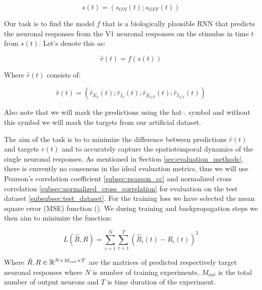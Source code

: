 \begin{equation*}
    s(t)=\left(s_{ON}(t); s_{OFF}(t)\right)
\end{equation*}

Our task is to find the model $f$ that is a biologically plausible RNN that predicts the neuronal responses from the V1 neuronal responses on the stimulus in time $t$ from $s(t)$. Let's denote this as:

\begin{equation*}
    \hat{r}(t) = f(s(t))
\end{equation*}

Where $\hat{r}(t)$ consists of:

\begin{equation*}
    \hat{r}(t) = \left(\hat{r}_{E_4}(t); \hat{r}_{I_4}(t); \hat{r}_{E_{2/3}}(t); \hat{r}_{I_{2/3}}(t)\right)
\end{equation*}

Also note that we will mark the predictions using the hat $\hat{.}$ symbol and without this symbol we will mark the targets from our artificial dataset.

The aim of the task is to to minimize the difference between predictions $\hat{r}(t)$ and targets $r(t)$ and to accurately capture the spatiotemporal dynamics of the single neuronal responses. As mentioned in Section \ref{sec:evaluation_methods}, there is currently no consensus in the ideal evaluation metrics, thus we will use Pearson's correlation coefficient \ref{subsec:pearson_cc} and normalized cross correlation \ref{subsec:normalized_cross_correlation} for evaluation on the test dataset \ref{subsubsec:test_dataset}. For the training loss we have selected the mean square error (MSE) function (\citet{alpaydin2020introduction}). We during training and backpropagation steps we then aim to minimize the function:

$$L(\hat{R}, R) = \sum_{i=1}^{N}\sum_{t=1}^{T}\left(\hat{R}_i(t) - R_i(t)\right)^2$$

Where $\hat{R}, R \in \mathbb{R}^{N \times M_{out} \times T}$ are the matrices of predicted respectively target neuronal responses where $N$ is number of training experiments, $M_{out}$ is the total number of output neurons and $T$ is time duration of the experiment.

